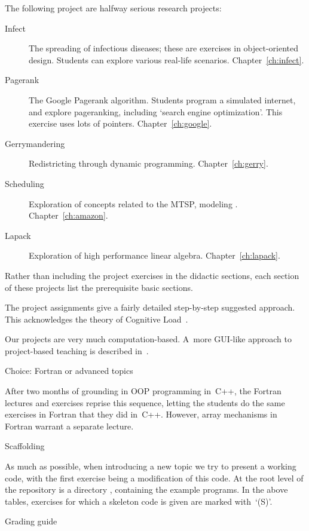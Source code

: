 The following project are halfway serious research projects:

\begin{description}
\item[Infect] The spreading of infectious diseases; these are
  exercises in object-oriented design. Students can explore various
  real-life scenarios. Chapter~\ref{ch:infect}.
\item[Pagerank] The Google Pagerank algorithm. Students program a
  simulated internet, and explore pageranking, including `search
  engine optimization'. This exercise uses lots of
  pointers. Chapter~\ref{ch:google}.
\item[Gerrymandering] Redistricting through dynamic programming.
  Chapter~\ref{ch:gerry}.
\item[Scheduling] Exploration of concepts related to the
  \ac{MTSP}, modeling .
  Chapter~\ref{ch:amazon}.
\item[Lapack] Exploration of high performance linear algebra.
  Chapter~\ref{ch:lapack}.
\end{description}

Rather than including the project exercises in the didactic sections,
each section of these projects list the prerequisite basic sections.

The project assignments give a fairly detailed step-by-step suggested
approach. This acknowledges the theory of Cognitive
Load~\cite{Ericson:parsons2017}.

Our projects are very much computation-based. A~more GUI-like approach
to project-based teaching is described
in~\cite{Chen:2012:project-cpp}.

 {Choice: Fortran or advanced topics}

After two months of grounding in OOP programming in~C++, the Fortran
lectures and exercises reprise this sequence, letting the students do
the same exercises in Fortran that they did in~C++.  However, array
mechanisms in Fortran warrant a separate lecture.

 {Scaffolding}

As much as possible, when introducing a new topic
we try to present a working code,
with the first exercise being a modification of this code.
At the root level of the repository is a directory ,
containing the example programs.
In the above tables,
exercises for which a skeleton code is given
are marked with~`(S)'.

 {Grading guide}

